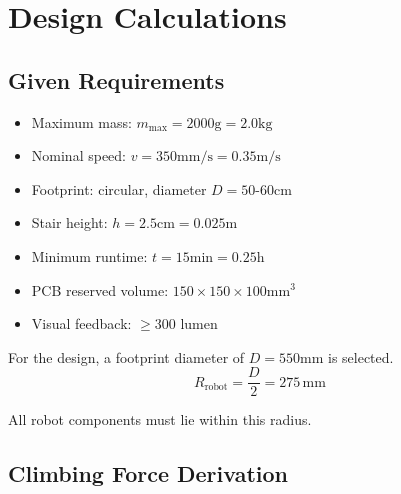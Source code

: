 \documentclass{article}
\begin{document}
\section{Design Calculations}

\subsection{Given Requirements}

\begin{itemize}
\item Maximum mass: $m_{\max} = 2000\text{g} = 2.0\text{kg}$
\item Nominal speed: $v = 350\text{mm/s} = 0.35\text{m/s}$
\item Footprint: circular, diameter $D = 50\text{-}60\text{cm}$
\item Stair height: $h = 2.5 \text{cm}  = 0.025\text{m}$
\item Minimum runtime: $t = 15 \text{min} = 0.25 \text{h}$
\item PCB reserved volume: $150 \times 150 \times 100\text{mm}^3$
\item Visual feedback: $\geq 300$ lumen
\end{itemize}

For the design, a footprint diameter of $D = 550\text{mm}$ is selected.
\[
R_{\text{robot}} = \frac{D}{2} = 275\,\text{mm}
\]

All robot components must lie within this radius.

\subsection{Climbing Force Derivation}
\end{document}
